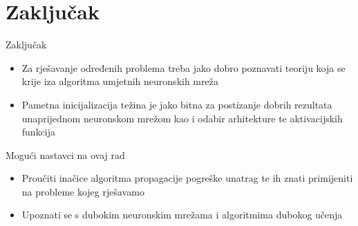 \documentclass{beamer}
\begin{document}
\section{Zaključak}
	\begin{frame}{Zaključak}
		\begin{itemize}
	        \item Za rješavanje određenih problema treba jako dobro poznavati teoriju koja se krije iza algoritma umjetnih neuronskih mreža
	        \smallskip
			\item Pametna inicijalizacija težina je jako bitna za postizanje dobrih rezultata unaprijednom neuronskom mrežom kao i odabir arhitekture te aktivacijskih funkcija 
		\end{itemize}
		
		\bigskip		
		\pause		
		
		\begin{block}{Mogući nastavci na ovaj rad}
			\begin{itemize}
				\item Proučiti inačice algoritma propagacije pogreške unatrag te ih znati primijeniti na probleme kojeg rješavamo
				\item Upoznati se s dubokim neuronskim mrežama i algoritmima dubokog učenja
			\end{itemize}
		\end{block}
	\end{frame}
\end{document}
